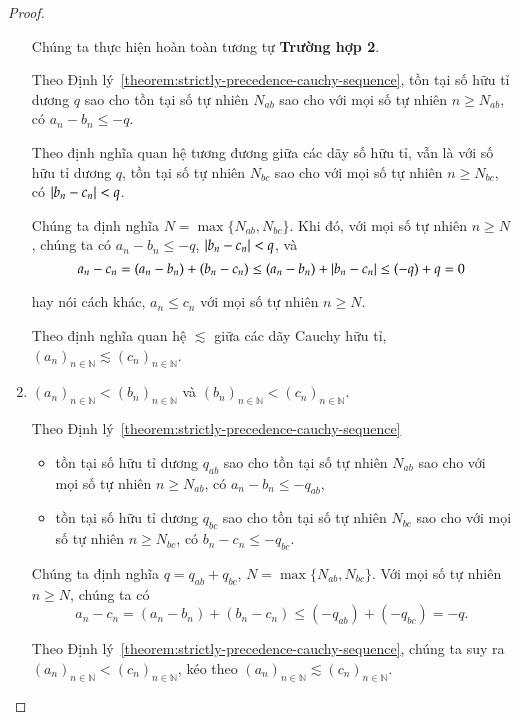 \begin{proof}
\begin{enumerate}[label={\textbf{Trường hợp \arabic*.}},itemindent=2cm]
              Chúng ta thực hiện hoàn toàn tương tự \textbf{Trường hợp 2}.

              Theo Định lý~\ref{theorem:strictly-precedence-cauchy-sequence}, tồn tại số hữu tỉ dương $q$ sao cho tồn tại số tự nhiên $N_{ab}$ sao cho với mọi số tự nhiên $n\geq N_{ab}$, có $a_{n} - b_{n}\leq -q$.

              Theo định nghĩa quan hệ tương đương giữa các dãy số hữu tỉ, vẫn là với số hữu tỉ dương $q$, tồn tại số tự nhiên $N_{bc}$ sao cho với mọi số tự nhiên $n\geq N_{bc}$, có $\left\vert{b_{n} - c_{n}}\right\vert < q$.

              Chúng ta định nghĩa $N = \max\{ N_{ab}, N_{bc} \}$. Khi đó, với mọi số tự nhiên $n\geq N$, chúng ta có $a_{n} - b_{n}\leq -q$, $\left\vert{b_{n} - c_{n}}\right\vert < q$, và
              \[
                  a_{n} - c_{n} = (a_{n} - b_{n}) + (b_{n} - c_{n})\leq (a_{n} - b_{n}) + \left\vert{b_{n} - c_{n}}\right\vert\leq (-q) + q = 0
              \]

              hay nói cách khác, $a_{n}\leq c_{n}$ với mọi số tự nhiên $n\geq N$.

              Theo định nghĩa quan hệ $\lesssim$ giữa các dãy Cauchy hữu tỉ, ${(a_{n})}_{n\in\mathbb{N}}\lesssim {(c_{n})}_{n\in\mathbb{N}}$.
        \item ${(a_{n})}_{n\in\mathbb{N}} < {(b_{n})}_{n\in\mathbb{N}}$ và ${(b_{n})}_{n\in\mathbb{N}} < {(c_{n})}_{n\in\mathbb{N}}$.

              Theo Định lý~\ref{theorem:strictly-precedence-cauchy-sequence}
              \begin{itemize}
                  \item tồn tại số hữu tỉ dương $q_{ab}$ sao cho tồn tại số tự nhiên $N_{ab}$ sao cho với mọi số tự nhiên $n\geq N_{ab}$, có $a_{n} - b_{n}\leq -q_{ab}$,
                  \item tồn tại số hữu tỉ dương $q_{bc}$ sao cho tồn tại số tự nhiên $N_{bc}$ sao cho với mọi số tự nhiên $n\geq N_{bc}$, có $b_{n} - c_{n}\leq -q_{bc}$.
              \end{itemize}

              Chúng ta định nghĩa $q = q_{ab} + q_{bc}$, $N = \max\{ N_{ab}, N_{bc} \}$. Với mọi số tự nhiên $n\geq N$, chúng ta có
              \[
                  a_{n} - c_{n} = (a_{n} - b_{n}) + (b_{n} - c_{n}) \leq (-q_{ab}) + (-q_{bc}) = -q .
              \]

              Theo Định lý~\ref{theorem:strictly-precedence-cauchy-sequence}, chúng ta suy ra ${(a_{n})}_{n\in\mathbb{N}} < {(c_{n})}_{n\in\mathbb{N}}$, kéo theo ${(a_{n})}_{n\in\mathbb{N}}\lesssim {(c_{n})}_{n\in\mathbb{N}}$.
    \end{enumerate}


\end{proof}
